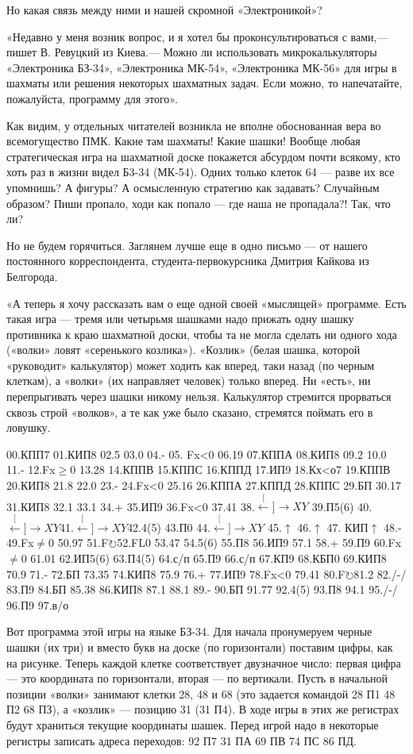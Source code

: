\documentclass[11pt,a4paper,oneside]{article}
\def\XY{$\stackrel[\leftarrow]{\rightarrow}{XY}$}
\def\FO{F$\circlearrowright$}
\begin{document}
Но какая связь между ними и нашей скромной «Электроникой»?

«Недавно у меня возник вопрос, и я хотел бы проконсультироваться с вами,— пишет В. Ревуцкий из Киева.— Можно ли использовать микрокалькуляторы «Электроника БЗ-34», «Электроника МК-54», «Электроника МК-56» для игры в шахматы или решения некоторых шахматных задач. Если можно, то напечатайте, пожалуйста, программу для этого».

Как видим, у отдельных читателей возникла не вполне обоснованная вера во всемогущество ПМК. Какие там шахматы! Какие шашки! Вообще любая стратегическая игра на шахматной доске покажется абсурдом почти всякому, кто хоть раз в жизни видел Б3-34 (МК-54). Одних только клеток 64 — разве их все упомнишь? А фигуры? А осмысленную стратегию как задавать? Случайным образом? Пиши пропало, ходи как попало — где наша не пропадала?! Так, что ли?

Но не будем горячиться. Заглянем лучше еще в одно письмо — от нашего постоянного корреспондента, студента-первокурсника Дмитрия Кайкова из Белгорода.

«А теперь я хочу рассказать вам о еще одной своей «мыслящей» программе. Есть такая игра — тремя или четырьмя шашками надо прижать одну шашку противника к краю шахматной доски, чтобы та не могла сделать ни одного хода («волки» ловят «серенького козлика»). «Козлик» (белая шашка, которой «руководит» калькулятор) может ходить как вперед, таки назад (по черным клеткам), а «волки» (их направляет человек) только вперед. Ни «есть», ни перепрыгивать через шашки никому нельзя. Калькулятор стремится прорваться сквозь строй «волков», а те как уже было сказано, стремятся поймать его в ловушку.

00.КПП7 01.КИП8 02.5 03.0 04.- 05. Fx<0 06.19 07.КППА 08.КИП8 09.2 10.0 11.- 12.Fx$\geq$0 13.28 14.КППВ 15.КППС 16.КППД 17.ИП9 18.Кх<о7 19.КППВ 20.КИП8 21.8 22.0 23.- 24.Fx<0 25.16 26.КППА 27.КППД 28.КППС 29.БП 30.17 31.КИП8
32.1 33.1 34.+ 35.ИП9 36.Fx<0 37.41 38.\XY
39.П5(6) 40.\XY 41.\XY 42.4(5) 43.П0 44.\XY
45.$\uparrow$ 46.$\uparrow$ 47. КИП$\uparrow$ 48.- 49.Fx$\neq$0 50.97 51.\FO 52.FL0 53.47 54.5(6) 55.П8 56.ИП9 57.1 58.+ 59.П9 60.Fx$\neq$0 61.01 62.ИП5(6) 63.П4(5)
64.с/п 65.П9 66.с/п 67.КП9 68.КБП0 69.КИП8 70.9 71.- 72.БП 73.35 74.КИП8 75.9 76.+ 77.ИП9 78.Fx<0 79.41 80.\FO 81.2 82./-/ 83.П9 84.БП 85.38 86.КИП8 87.1 88.1 89.- 90.БП 91.77 92.4(5) 93.П8 94.1 95./-/ 96.П9 97.в/о

Вот программа этой игры на языке БЗ-34. Для начала пронумеруем черные шашки (их три) и вместо букв на доске (по горизонтали) поставим цифры, как на рисунке. Теперь каждой клетке соответствует двузначное число: первая цифра — это координата по горизонтали, вторая — по вертикали. Пусть в начальной позиции «волки» занимают клетки 28, 48 и 68 (это задается командой 28 П1 48 П2 68 ПЗ), а «козлик» — позицию 31 (31 П4). В ходе игры в этих же регистрах будут храниться текущие координаты шашек. Перед игрой надо в некоторые регистры записать адреса переходов: 92 П7 31 ПА 69 ПВ 74 ПС 86 ПД.
\end{document}

